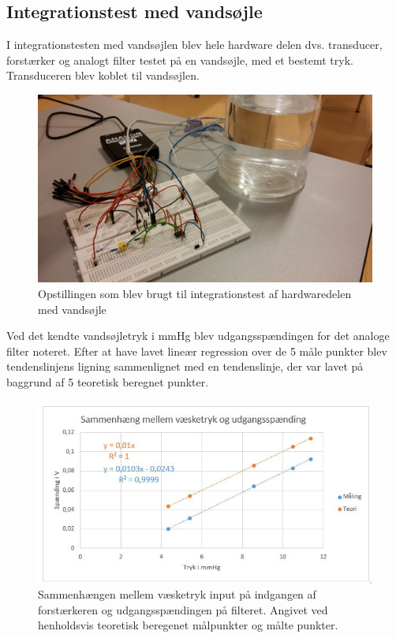 \subsection{Integrationstest med vandsøjle}
I integrationstesten med vandsøjlen blev hele hardware delen dvs. transducer, forstærker og analogt filter testet på en vandsøjle, med et bestemt tryk. Transduceren blev koblet til vandsøjlen.\\
\begin{figure}[H]
	\centering
	\includegraphics[width=1\textwidth]{Figurer/Hardware/IntegrationVandsoejle}
	\caption{Opstillingen som blev brugt til integrationstest af hardwaredelen med vandsøjle}
	\label{fig:IntegrationVandsoejle}
\end{figure}
Ved det kendte vandsøjletryk i mmHg blev udgangsspændingen for det analoge filter noteret. Efter at have lavet lineær regression over de 5 måle punkter blev tendenslinjens ligning sammenlignet med en tendenslinje, der var lavet på baggrund af 5 teoretisk beregnet punkter. 
\begin{figure}[H]
	\centering
	\includegraphics[width=1\textwidth]{Figurer/Hardware/VaesketrykUdgangsspaending}
	\caption{Sammenhængen mellem væsketryk input på indgangen af forstærkeren og udgangsspændingen på filteret. Angivet ved henholdsvis teoretisk beregenet målpunkter og målte punkter.}
	\label{fig:Vaesketryk}
\end{figure}
